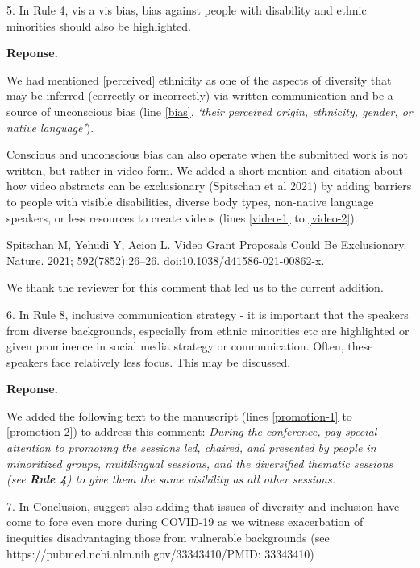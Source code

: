 \documentclass{article}
\newenvironment{Reply}{\noindent\color{BlueViolet}\textbf{Reponse.}}{\vspace{1em}}
\begin{document}
5. In Rule 4, vis a vis bias, bias against people with disability and ethnic minorities should also be highlighted.

\begin{Reply}
   
    We had mentioned [perceived] ethnicity as one of the aspects of diversity that may be inferred (correctly or incorrectly) via written communication and be a source of unconscious bias  (line \ref{bias}, \textit{`their perceived origin, ethnicity, gender, or native language'}). 
    
    Conscious and unconscious bias can also operate when the submitted work is not written, but rather in video form. We added a short mention and citation about how video abstracts can be exclusionary (Spitschan et al 2021) by adding barriers to people with visible disabilities, diverse body types, non-native language speakers, or less resources to create videos (lines \ref{video-1} to \ref{video-2}).
    
    Spitschan M, Yehudi Y, Acion L. Video Grant Proposals Could Be Exclusionary. 
    Nature. 2021; 592(7852):26–26. doi:10.1038/d41586-021-00862-x.

    We thank the reviewer for this comment that led us to the current addition.
\end{Reply}

6. In Rule 8, inclusive communication strategy - it is important that the speakers from diverse backgrounds, especially from ethnic minorities etc are highlighted or given prominence in social media strategy or communication. Often, these speakers face relatively less focus. This may be discussed.

\begin{Reply}

    We added the following text to the manuscript (lines \ref{promotion-1} to \ref{promotion-2}) to address this comment: 
    \textit{During the conference, pay special attention to promoting the sessions led, chaired, and presented by people in minoritized groups, multilingual sessions, and the diversified thematic sessions (see \textbf{Rule 4}) to give them the same visibility as all other sessions.}
\end{Reply}

7. In Conclusion, suggest also adding that issues of diversity and inclusion have come to fore even more during COVID-19 as we witness exacerbation of inequities disadvantaging those from vulnerable backgrounds (see https://pubmed.ncbi.nlm.nih.gov/33343410/PMID: 33343410)
\end{document}
